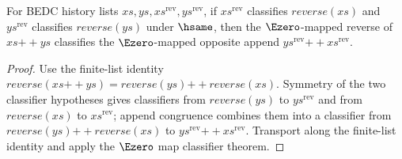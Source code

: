 \begin{theorem}
\label{thm:list-classifier-map-e0-reverse-append-antimorphism}
For BEDC history lists $xs,ys,xs^{\mathrm{rev}},ys^{\mathrm{rev}}$, if
$xs^{\mathrm{rev}}$ classifies $reverse(xs)$ and $ys^{\mathrm{rev}}$
classifies $reverse(ys)$ under $\hsame$, then the $\Ezero$-mapped reverse of
$xs{++}ys$ classifies the $\Ezero$-mapped opposite append
$ys^{\mathrm{rev}}{++}xs^{\mathrm{rev}}$.
\end{theorem}
\begin{proof}
Use the finite-list identity
$reverse(xs{++}ys)=reverse(ys){++}reverse(xs)$. Symmetry of the two classifier
hypotheses gives classifiers from $reverse(ys)$ to $ys^{\mathrm{rev}}$ and
from $reverse(xs)$ to $xs^{\mathrm{rev}}$; append congruence combines them into
a classifier from $reverse(ys){++}reverse(xs)$ to
$ys^{\mathrm{rev}}{++}xs^{\mathrm{rev}}$. Transport along the finite-list
identity and apply the $\Ezero$ map classifier theorem.
\end{proof}

